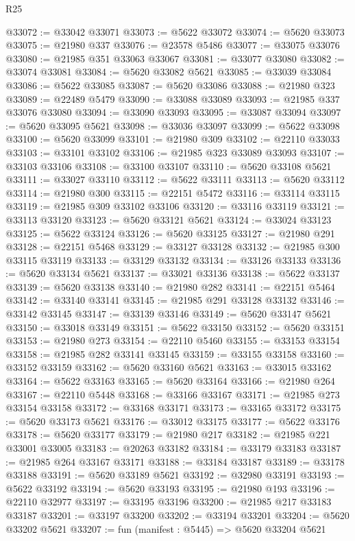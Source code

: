 \begin{lexlean}{R25}
\begin{coremodule}
@33072 := @33042 @33071
@33073 := @5622 @33072
@33074 := @5620 @33073
@33075 := @21980 @337
@33076 := @23578 @5486
@33077 := @33075 @33076
@33080 := @21985 @351 @33063 @33067
@33081 := @33077 @33080
@33082 := @33074 @33081
@33084 := @5620 @33082 @5621
@33085 := @33039 @33084
@33086 := @5622 @33085
@33087 := @5620 @33086
@33088 := @21980 @323
@33089 := @22489 @5479
@33090 := @33088 @33089
@33093 := @21985 @337 @33076 @33080
@33094 := @33090 @33093
@33095 := @33087 @33094
@33097 := @5620 @33095 @5621
@33098 := @33036 @33097
@33099 := @5622 @33098
@33100 := @5620 @33099
@33101 := @21980 @309
@33102 := @22110 @33033
@33103 := @33101 @33102
@33106 := @21985 @323 @33089 @33093
@33107 := @33103 @33106
@33108 := @33100 @33107
@33110 := @5620 @33108 @5621
@33111 := @33027 @33110
@33112 := @5622 @33111
@33113 := @5620 @33112
@33114 := @21980 @300
@33115 := @22151 @5472
@33116 := @33114 @33115
@33119 := @21985 @309 @33102 @33106
@33120 := @33116 @33119
@33121 := @33113 @33120
@33123 := @5620 @33121 @5621
@33124 := @33024 @33123
@33125 := @5622 @33124
@33126 := @5620 @33125
@33127 := @21980 @291
@33128 := @22151 @5468
@33129 := @33127 @33128
@33132 := @21985 @300 @33115 @33119
@33133 := @33129 @33132
@33134 := @33126 @33133
@33136 := @5620 @33134 @5621
@33137 := @33021 @33136
@33138 := @5622 @33137
@33139 := @5620 @33138
@33140 := @21980 @282
@33141 := @22151 @5464
@33142 := @33140 @33141
@33145 := @21985 @291 @33128 @33132
@33146 := @33142 @33145
@33147 := @33139 @33146
@33149 := @5620 @33147 @5621
@33150 := @33018 @33149
@33151 := @5622 @33150
@33152 := @5620 @33151
@33153 := @21980 @273
@33154 := @22110 @5460
@33155 := @33153 @33154
@33158 := @21985 @282 @33141 @33145
@33159 := @33155 @33158
@33160 := @33152 @33159
@33162 := @5620 @33160 @5621
@33163 := @33015 @33162
@33164 := @5622 @33163
@33165 := @5620 @33164
@33166 := @21980 @264
@33167 := @22110 @5448
@33168 := @33166 @33167
@33171 := @21985 @273 @33154 @33158
@33172 := @33168 @33171
@33173 := @33165 @33172
@33175 := @5620 @33173 @5621
@33176 := @33012 @33175
@33177 := @5622 @33176
@33178 := @5620 @33177
@33179 := @21980 @217
@33182 := @21985 @221 @33001 @33005
@33183 := @20263 @33182
@33184 := @33179 @33183
@33187 := @21985 @264 @33167 @33171
@33188 := @33184 @33187
@33189 := @33178 @33188
@33191 := @5620 @33189 @5621
@33192 := @32980 @33191
@33193 := @5622 @33192
@33194 := @5620 @33193
@33195 := @21980 @193
@33196 := @22110 @32977
@33197 := @33195 @33196
@33200 := @21985 @217 @33183 @33187
@33201 := @33197 @33200
@33202 := @33194 @33201
@33204 := @5620 @33202 @5621
@33207 := fun (manifest : @5445) => @5620 @33204 @5621

\end{coremodule}
\end{lexlean}
